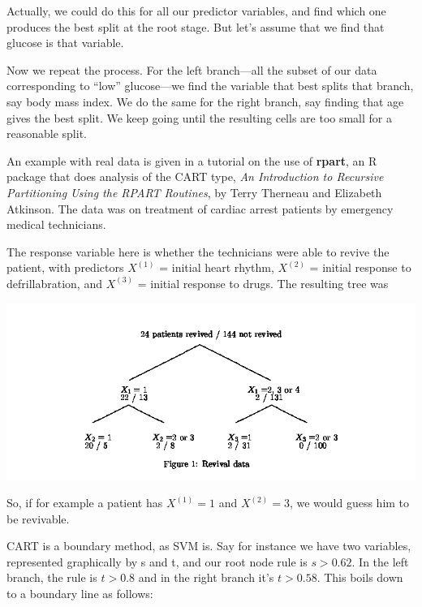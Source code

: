 Actually, we could do this for all our predictor variables, and find
which one produces the best split at the root stage.  But let's assume
that we find that glucose is that variable.

Now we repeat the process.  For the left branch---all the subset of our
data corresponding to ``low'' glucose---we find the variable that best
splits that branch, say body mass index.  We do the same for the right
branch, say finding that age gives the best split.  We keep going until
the resulting cells are too small for a reasonable split.

An example with real data is given in a tutorial on the use of {\bf
rpart}, an R package that does analysis of the CART type, {\it An
Introduction to Recursive Partitioning Using the RPART Routines}, by
Terry Therneau and Elizabeth Atkinson.  The data was on treatment of
cardiac arrest patients by emergency medical technicians.

The response variable here is whether the technicians were able to
revive the patient, with predictors $X^{(1)}$ = initial heart rhythm,
$X^{(2)}$ = initial response to defrillabration, and $X^{(3)}$ = initial
response to drugs.  The resulting tree was

\includegraphics[width=7.0in]{RPart.jpg}

So, if for example a patient has $X^{(1)}=1$ and $X^{(2)} = 3$, we would
guess him to be revivable.

CART is a boundary method, as SVM is.  Say for instance we have two
variables, represented graphically by s and t, and our root node rule is
$s > 0.62$.  In the left branch, the rule is $t > 0.8$ and in the right
branch it's $t > 0.58$.  This boils down to a boundary line as follows:

